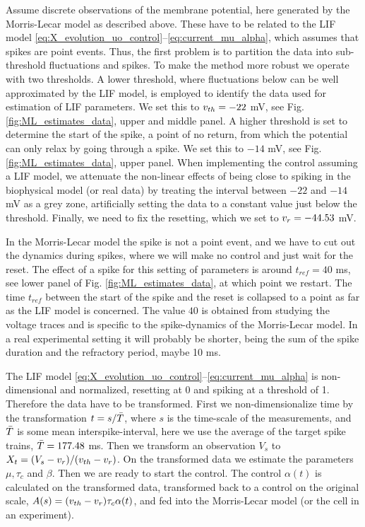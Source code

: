 Assume discrete observations of the membrane potential, here generated
by the Morris-Lecar model as described above. These have to be related to the LIF model
\eqref{eq:X_evolution_uo_control}--\eqref{eq:current_mu_alpha}, which 
assumes that spikes are point events. Thus, the first problem is to
partition the data into sub-threshold fluctuations and spikes. To make
the method more robust we operate with two thresholds. A lower
threshold, where fluctuations below can be well approximated by the
LIF model, is employed to identify the data used for estimation of LIF
parameters. We set this to $v_{th} = -22$ mV, see
Fig. \ref{fig:ML_estimates_data}, upper and middle panel. A higher threshold is set to
determine the start of the spike, a point of no return, from which the potential can only
relax by going through a spike. We set this to $-14$ mV, see
Fig. \ref{fig:ML_estimates_data}, upper panel. When implementing the control
assuming a LIF model, we attenuate the non-linear effects of being
close to spiking in the biophysical model (or real data) by treating the interval between $-22$ and $-14$ mV
as a grey zone, artificially setting the data to a constant value just
below the threshold. Finally, we need to fix the resetting, which we
set to $v_r = -44.53$ mV.

In the Morris-Lecar model the spike is not a point event, and we have
to cut out the dynamics during spikes, where we will make no control
and just wait for the reset. The effect of a spike for this setting of
parameters is around $t_{ref} = 40$ ms, see lower panel of
Fig. \ref{fig:ML_estimates_data}, at
which point we restart. The time $t_{ref}$ between the start of the spike and
the reset is collapsed to
a point as far as the LIF model is concerned. The value $40$ is obtained from studying
the voltage traces and is specific to the spike-dynamics of the Morris-Lecar
model. In a real experimental setting it will probably be shorter,
being the sum of the spike duration and the refractory period, 
maybe 10 ms.

The LIF model \eqref{eq:X_evolution_uo_control}--\eqref{eq:current_mu_alpha}  is
non-dimensional and normalized, resetting at 0 and spiking at a threshold of 1.
Therefore the data have to be transformed. First we non-dimensionalize time by
the transformation $t=s/\bar T$, where $s$ is the time-scale of the
measurements, and $\bar T$ is some mean interspike-interval, here we use the
average of the target spike trains, $\bar T=177.48$ ms. Then we transform an
observation $V_s$ to $X_t =(V_s - v_r)/(v_{th} - v_r)$. On the transformed
data we estimate the parameters $\mu, \tau_c$ and $\beta$. Then we are ready to
start the control. The control $\alpha (t)$ is calculated on the transformed
data, transformed back to a control on the original scale, $A(s)=(v_{th} -
v_r)\tau_c \alpha (t)$, and fed into the Morris-Lecar model (or the cell in
an experiment).

